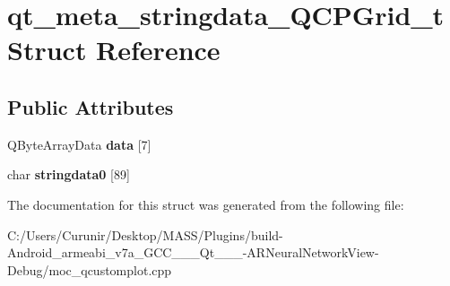 \hypertarget{structqt__meta__stringdata___q_c_p_grid__t}{}\section{qt\+\_\+meta\+\_\+stringdata\+\_\+\+Q\+C\+P\+Grid\+\_\+t Struct Reference}
\label{structqt__meta__stringdata___q_c_p_grid__t}
\subsection*{Public Attributes}
\begin{DoxyCompactItemize}
\item 
\mbox{\label{structqt__meta__stringdata___q_c_p_grid__t_a3fe7c814c9e7e9794ba3adc422708e5c}} 
Q\+Byte\+Array\+Data {\bfseries data} \mbox{[}7\mbox{]}
\item 
\mbox{\label{structqt__meta__stringdata___q_c_p_grid__t_a63e24d1538e12591d627f0f3c32518f8}} 
char {\bfseries stringdata0} \mbox{[}89\mbox{]}
\end{DoxyCompactItemize}


The documentation for this struct was generated from the following file\+:\begin{DoxyCompactItemize}
\item 
C\+:/\+Users/\+Curunir/\+Desktop/\+M\+A\+S\+S/\+Plugins/build-\/\+Android\+\_\+armeabi\+\_\+v7a\+\_\+\+G\+C\+C\+\_\+\_\+\_\+\+Qt\+\_\+\_\+\_-\/\+A\+R\+Neural\+Network\+View-\/\+Debug/moc\+\_\+qcustomplot.\+cpp\end{DoxyCompactItemize}
